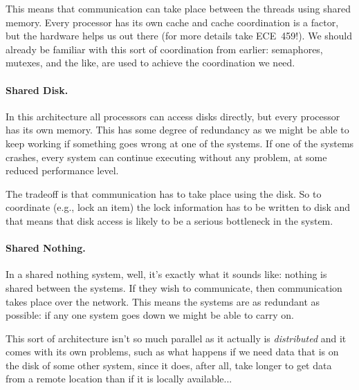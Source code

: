 This means that communication can take place between the threads using shared memory. Every processor has its own cache and cache coordination is a factor, but the hardware helps us out there (for more details take ECE~459!). We should already be familiar with this sort of coordination from earlier: semaphores, mutexes, and the like, are used to achieve the coordination we need.

\paragraph{Shared Disk.} In this architecture all processors can access disks directly, but every processor has its own memory. This has some degree of redundancy as we might be able to keep working if something goes wrong at one of the systems. If one of the systems crashes, every system can continue executing without any problem, at some reduced performance level. 

The tradeoff is that communication has to take place using the disk. So to coordinate (e.g., lock an item) the lock information has to be written to disk and that means that disk access is likely to be a serious bottleneck in the system.

\paragraph{Shared Nothing.} In a shared nothing system, well, it's exactly what it sounds like: nothing is shared between the systems. If they wish to communicate, then communication takes place over the network. This means the systems are as redundant as possible: if any one system goes down we might be able to carry on. 

This sort of architecture isn't so much parallel as it actually is \textit{distributed} and it comes with its own problems, such as what happens if we need data that is on the disk of some other system, since it does, after all, take longer to get data from a remote location than if it is locally available...




